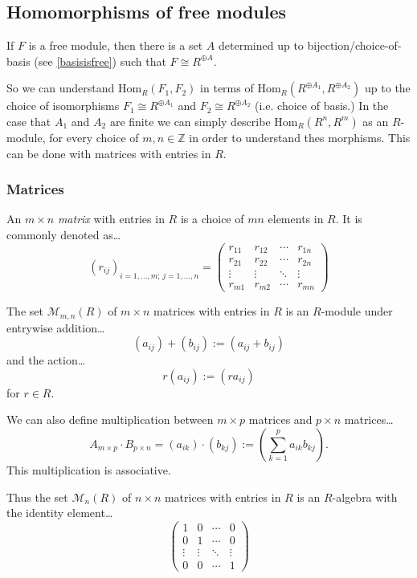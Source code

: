 \subsection{Homomorphisms of free modules}

If $F$ is a free module, then there is a set $A$ determined up to bijection/choice-of-basis (see \ref{basisisfree}) such that $F \cong R^{\oplus A}$.

So we can understand Hom$_R(F_1, F_2)$ in terms of Hom$_R(R^{\oplus A_1}, R^{\oplus A_2})$ up to the choice of isomorphisms $F_1 \cong R^{\oplus A_1}$
and $F_2 \cong R^{\oplus A_2}$ (i.e. choice of basis.) In the case that $A_1$ and $A_2$ are finite we can simply describe Hom$_R(R^n, R^m)$ as an $R$-module,
for every choice of $m,n \in \mathbb{Z}$ in order to understand thes morphisms. This can be done with matrices with entries in $R$.

\subsubsection{Matrices}\label{matrices}
An $m \times n$ \emph{matrix} with entries in $R$ is a choice of $mn$ elements in $R$. It is commonly denoted as\dots
\[
(r_{ij})_{i=1,\dots,m;\,j=1,\dots,n} =
\begin{pmatrix}
	r_{11} & r_{12} & \cdots & r_{1n} \\
	r_{21} & r_{22} & \cdots & r_{2n} \\
	\vdots & \vdots & \ddots & \vdots \\
	r_{m1} & r_{m2} & \cdots & r_{mn}
\end{pmatrix}
\]

The set $\mathcal{M}_{m,n}(R)$ of $m \times n$ matrices with entries in $R$ is an $R$-module under entrywise addition\dots
$$(a_{ij}) + (b_{ij}) := (a_{ij} + b_{ij})$$
and the action\dots
$$r(a_{ij}) := (ra_{ij})$$
for $r \in R$.

We can also define multiplication between $m \times p$ matrices and $p \times n$ matrices\dots
$$A_{m \times p} \cdot B_{p \times n} = (a_{ik}) \cdot (b_{kj}) := \left( \sum_{k=1}^{p} a_{ik} b_{kj} \right).$$
This multiplication is associative.

Thus the set $\mathcal{M}_n(R)$ of $n \times n$ matrices with entries in $R$ is an $R$-algebra with the identity element\dots
\[
\begin{pmatrix}
	1 & 0 & \cdots & 0 \\
	0 & 1 & \cdots & 0 \\
	\vdots & \vdots & \ddots & \vdots \\
	0 & 0 & \cdots & 1
\end{pmatrix}
\]

